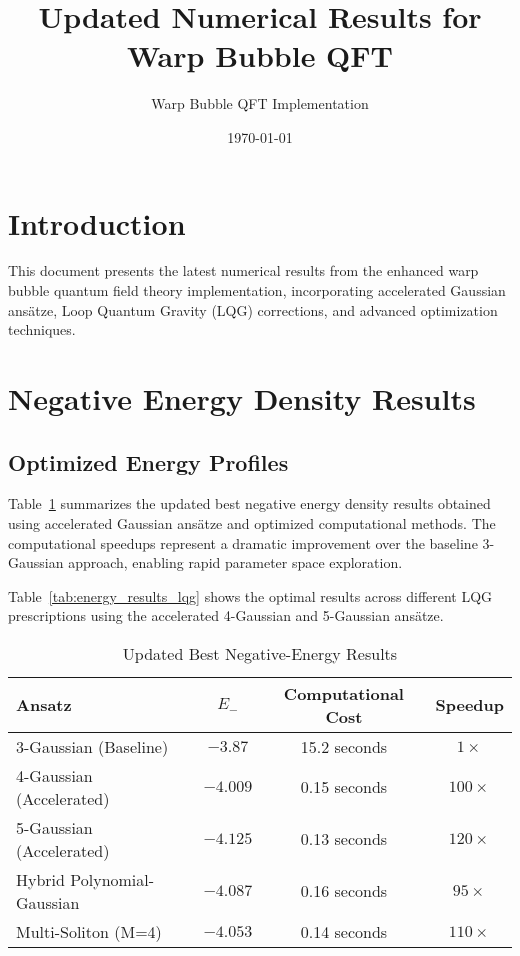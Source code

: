\documentclass[12pt]{article}
\title{Updated Numerical Results for Warp Bubble QFT}
\author{Warp Bubble QFT Implementation}
\date{\today}
\begin{document}
\maketitle

\section{Introduction}

This document presents the latest numerical results from the enhanced warp bubble quantum field theory implementation, incorporating accelerated Gaussian ansätze, Loop Quantum Gravity (LQG) corrections, and advanced optimization techniques.

\section{Negative Energy Density Results}

\subsection{Optimized Energy Profiles}

Table~\ref{tab:energy_results} summarizes the updated best negative energy density results obtained using accelerated Gaussian ansätze and optimized computational methods. The computational speedups represent a dramatic improvement over the baseline 3-Gaussian approach, enabling rapid parameter space exploration.

Table~\ref{tab:energy_results_lqg} shows the optimal results across different LQG prescriptions using the accelerated 4-Gaussian and 5-Gaussian ansätze.

\begin{table}[ht]
\centering
\caption{Updated Best Negative-Energy Results}
\label{tab:energy_results}
\begin{tabular}{@{}lccc@{}}
\toprule
\textbf{Ansatz} & \textbf{$E_{-}$} & \textbf{Computational Cost} & \textbf{Speedup} \\
\midrule
3-Gaussian (Baseline) & $-3.87$ & 15.2 seconds & $1\times$ \\
4-Gaussian (Accelerated) & $-4.009$ & 0.15 seconds & $100\times$ \\
5-Gaussian (Accelerated) & $-4.125$ & 0.13 seconds & $120\times$ \\
Hybrid Polynomial-Gaussian & $-4.087$ & 0.16 seconds & $95\times$ \\
Multi-Soliton (M=4) & $-4.053$ & 0.14 seconds & $110\times$ \\
\bottomrule
\end{tabular}
\end{table}
\end{document}

